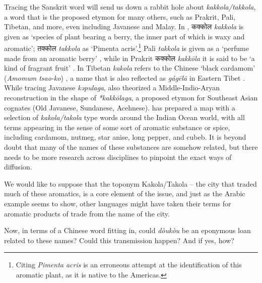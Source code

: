 \documentclass[12pt]{article}
\newcommand{\bo}[1]{\tibetanfont{#1}\rmfamily}
\newcommand{\jv}[1]{\javanesefont{#1}\rmfamily}
\newcommand{\tc}[1]{\traditionalchinesefont{#1}\rmfamily}
\begin{document}
Tracing the Sanskrit word will send us down a rabbit hole about \textit{kakkola/takkola}, a word that is the proposed etymon for many others, such as Prakrit, Pali, Tibetan, and more, even including Javanese and Malay. In \textcite[431, 241]{monier-williams_1899_sanskritenglish}, कक्कोल \textit{kakkola} is given as `species of plant bearing a berry, the inner part of which is waxy and aromatic'; तक्कोल \textit{takkola} as `Pimenta acris'.\footnote{Citing \textit{Pimenta acris} is an erroneous attempt at the identification of this aromatic plant, as it is native to the Americas.} Pali \textit{takkola} is given as a `perfume made from an aromatic berry' \parencite[292]{palitextsociety_1921_pali}, while in Prakrit कक्कोल \textit{kakkōla} it is said to be `a kind of fragrant fruit' \parencite[213]{sheth_1923_paiasaddamahannavo}. In Tibetan \bo{ཀ་ཀོ་ལ} \textit{kakola} refers to the Chinese `black cardamom' (\textit{Amomum tsao-ko}) \parencite[1]{goldstein_2001_new}, a name that is also reflected as \tc{嘎哥拉} \textit{gágēlā} in Eastern Tibet \parencite{hu_2005_food}. While tracing Javanese \textit{kəpulaga}, \textcite[417]{hoogervorst_2017_role} also theorized a Middle-Indio-Aryan reconstruction in the shape of \textit{*kakkōlaga}, a proposed etymon for Southeast Asian cognates (Old Javanese, Sundanese, Acehnese). \textcite[20]{hoogervorst_2013_southeast} has prepared a map with a selection of \textit{kakola/takola} type words around the Indian Ocean world, with all terms appearing in the sense of some sort of aromatic substance or spice, including cardamom, nutmeg, star anise, long pepper, and cubeb. It is beyond doubt that many of the names of these substances are somehow related, but there needs to be more research across disciplines to pinpoint the exact ways of diffusion. 




We would like to suppose that the toponym Kakola/Takola -- the city that traded much of these aromatics, is a core element of the issue, and just as the Arabic example seems to show, other languages might have taken their terms for aromatic products of trade from the name of the city. 

Now, in terms of a Chinese word fitting in, could \tc{豆蔻} \textit{dòukòu} be an eponymous loan related to these names? Could this transmission happen? And if yes, how?
\end{document}
